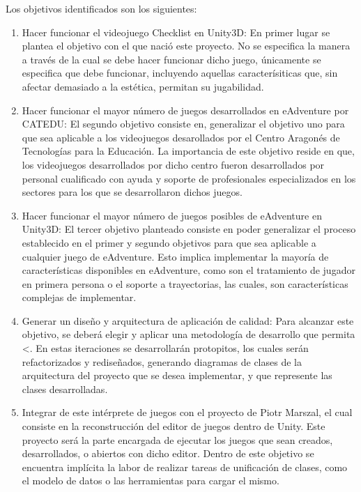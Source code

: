 Los objetivos identificados son los siguientes:
\begin{enumerate}
	\item Hacer funcionar el videojuego Checklist en Unity3D: En primer lugar se plantea el objetivo con el que nació este proyecto. No se especifica la manera a través de la cual se debe hacer funcionar dicho juego, únicamente se especifica que debe funcionar, incluyendo aquellas caracterísiticas que, sin afectar demasiado a la estética, permitan su jugabilidad.
	
	\item Hacer funcionar el mayor número de juegos desarrollados en eAdventure por CATEDU: El segundo objetivo consiste en, generalizar el objetivo uno para que sea aplicable a los videojuegos desarollados por el Centro Aragonés de Tecnologías para la Educación. La importancia de este objetivo reside en que, los videojuegos desarrollados por dicho centro fueron desarrollados por personal cualificado con ayuda y soporte de profesionales especializados en los sectores para los que se desarrollaron dichos juegos.
	
	\item Hacer funcionar el mayor número de juegos posibles de eAdventure en Unity3D: El tercer objetivo planteado consiste en poder generalizar el proceso establecido en el primer y segundo objetivos para que sea aplicable a cualquier juego de eAdventure. Esto implica implementar la mayoría de características disponibles en eAdventure, como son el tratamiento de jugador en primera persona o el soporte a trayectorias, las cuales, son características complejas de implementar.
	
	\item Generar un diseño y arquitectura de aplicación de calidad: Para alcanzar este objetivo, se deberá elegir y aplicar una metodología de desarrollo que permita <. En estas iteraciones se desarrollarán protopitos, los cuales serán refactorizados y rediseñados, generando diagramas de clases de la arquitectura del proyecto que se desea implementar, y que represente las clases desarrolladas.
	
	\item Integrar de este intérprete de juegos con el proyecto de Piotr Marszal, el cual consiste en la reconstrucción del editor de juegos dentro de Unity. Este proyecto será la parte encargada de ejecutar los juegos que sean creados, desarrollados, o abiertos con dicho editor. Dentro de este objetivo se encuentra implícita la labor de realizar tareas de unificación de clases, como el modelo de datos o las herramientas para cargar el mismo.
	

\end{enumerate}
